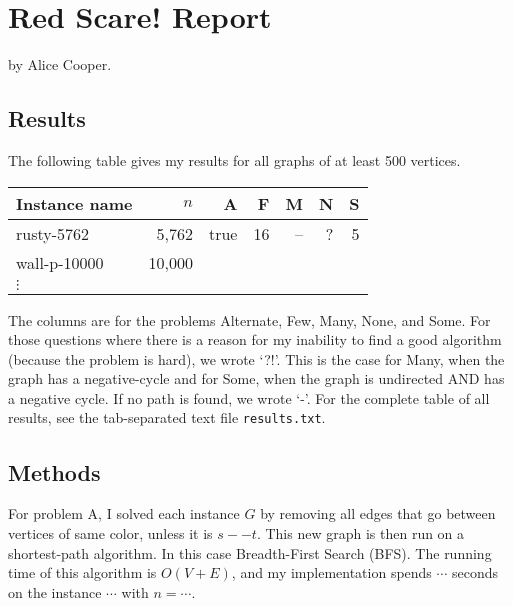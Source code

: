 \documentclass{tufte-handout}
\begin{document}
\section{Red Scare! Report}

by Alice Cooper.

\subsection{Results}

The following table gives my results for all graphs of at least 500 vertices.

\medskip
\begin{tabular}{lrrrrrr}
  \toprule
  Instance name & $n$ & A & F & M & N & S \\
  \midrule
  rusty-5762 & 5,762 & true & 16 & -- & ? & 5 \\
  wall-p-10000 & 10,000 &\\	
  $\vdots$\\
  \bottomrule
\end{tabular}
\medskip

The columns are for the problems Alternate, Few, Many, None, and Some.
For those questions where there is a reason for my inability to find a good algorithm (because the problem is hard), we wrote `?!'.
This is the case for Many, when the graph has a negative-cycle and for Some, when the graph is undirected AND has a negative cycle.
If no path is found, we wrote `-'.
For the complete table of all results, see the tab-separated text file {\tt results.txt}.

\subsection{Methods}

For problem A, I solved each instance $G$ by removing all edges that go between vertices of same color, unless it is $s -- t$. This new graph is then run on a shortest-path algorithm. In this case Breadth-First Search (BFS).
The running time of this algorithm is $O(V + E)$, and my implementation spends $\cdots$ seconds on the instance $\cdots$ with  $n=\cdots$.
\end{document}
